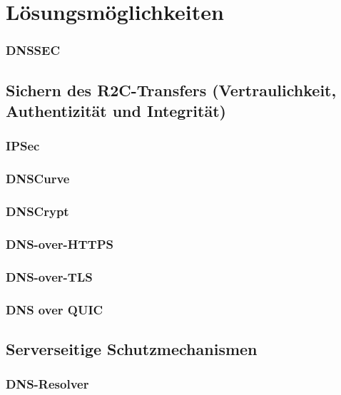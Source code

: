 \chapter{Lösungsmöglichkeiten}

\subsection{DNSSEC}

\section{Sichern des R2C-Transfers (Vertraulichkeit, Authentizität und Integrität)}

\subsection{IPSec}

\subsection{DNSCurve}

\subsection{DNSCrypt}

\subsection{DNS-over-HTTPS}

\subsection{DNS-over-TLS}

\subsection{DNS over QUIC}

\section{Serverseitige Schutzmechanismen}

\subsection{DNS-Resolver}

\begin{comment}
Wenn kein DNSSEC erzwungen wird (was noch schwer möglich ist) muss das risiko flascher Records akzeptiert werden. Über spezielle, vertrauenswündige Resolver kann das Risiko jedoch verringert werden.
\end{comment}

